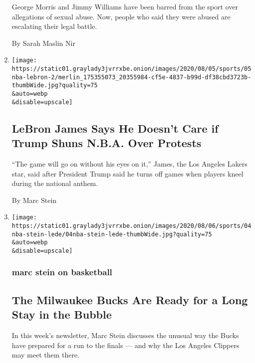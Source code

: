 \begin{enumerate}
  George Morris and Jimmy Williams have been barred from the sport over
  allegations of sexual abuse. Now, people who said they were abused are
  escalating their legal battle.

  By Sarah Maslin Nir
\item
  \href{/2020/08/06/sports/basketball/lebron-james-trump.html}{}

  \texttt{[image: https://static01.graylady3jvrrxbe.onion/images/2020/08/05/sports/05nba-lebron-2/merlin\_175355073\_20355984-cf5e-4837-b99d-df38cbd3723b-thumbWide.jpg?quality=75\\\&auto=webp\\\&disable=upscale]}

  \hypertarget{lebron-james-says-he-doesnt-care-if-trump-shuns-nba-over-protests}{%
  \subsection{LeBron James Says He Doesn't Care if Trump Shuns N.B.A.
  Over
  Protests}\label{lebron-james-says-he-doesnt-care-if-trump-shuns-nba-over-protests}}

  ``The game will go on without his eyes on it,'' James, the Los Angeles
  Lakers star, said after President Trump said he turns off games when
  players kneel during the national anthem.

  By Marc Stein
\item
  \href{/2020/08/05/sports/basketball/nba-bucks-giannis-antetokounmpo.html}{}

  \texttt{[image: https://static01.graylady3jvrrxbe.onion/images/2020/08/06/sports/04nba-stein-lede/04nba-stein-lede-thumbWide.jpg?quality=75\\\&auto=webp\\\&disable=upscale]}

  \hypertarget{marc-stein-on-basketball}{%
  \subsubsection{marc stein on
  basketball}\label{marc-stein-on-basketball}}

  \hypertarget{the-milwaukee-bucks-are-ready-for-a-long-stay-in-the-bubble}{%
  \subsection{The Milwaukee Bucks Are Ready for a Long Stay in the
  Bubble}\label{the-milwaukee-bucks-are-ready-for-a-long-stay-in-the-bubble}}

  In this week's newsletter, Marc Stein discusses the unusual way the
  Bucks have prepared for a run to the finals --- and why the Los
  Angeles Clippers may meet them there.


\end{enumerate}
